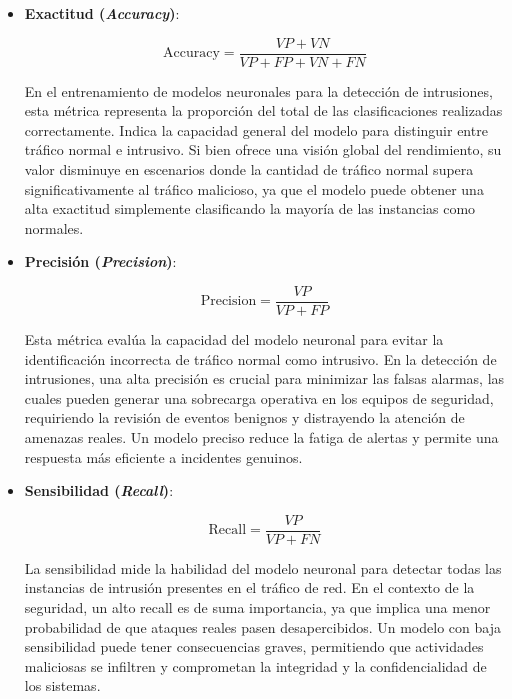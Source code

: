 \begin{itemize}
    \item \textbf{Exactitud (\textit{Accuracy})}: \label{met:Accuracy}
    
\begin{equation}
    \text{Accuracy} = \frac{VP + VN}{VP + FP + VN + FN}
\end{equation}

En el entrenamiento de modelos neuronales para la detección de intrusiones, esta métrica representa la proporción del total de las clasificaciones realizadas correctamente. Indica la capacidad general del modelo para distinguir entre tráfico normal e intrusivo. Si bien ofrece una visión global del rendimiento, su valor disminuye en escenarios donde la cantidad de tráfico normal supera significativamente al tráfico malicioso, ya que el modelo puede obtener una alta exactitud simplemente clasificando la mayoría de las instancias como normales.

\item \textbf{Precisión (\textit{Precision})}: \label{met:Precision}

\begin{equation}
    \text{Precision} = \frac{VP}{VP + FP}
\end{equation}

Esta métrica evalúa la capacidad del modelo neuronal para evitar la identificación incorrecta de tráfico normal como intrusivo. En la detección de intrusiones, una alta precisión es crucial para minimizar las falsas alarmas, las cuales pueden generar una sobrecarga operativa en los equipos de seguridad, requiriendo la revisión de eventos benignos y distrayendo la atención de amenazas reales. Un modelo preciso reduce la fatiga de alertas y permite una respuesta más eficiente a incidentes genuinos.

\item \textbf{Sensibilidad (\textit{Recall})}: \label{met:Recall}

\begin{equation}
    \text{Recall} = \frac{VP}{VP + FN}
\end{equation}

La sensibilidad mide la habilidad del modelo neuronal para detectar todas las instancias de intrusión presentes en el tráfico de red. En el contexto de la seguridad, un alto recall es de suma importancia, ya que implica una menor probabilidad de que ataques reales pasen desapercibidos. Un modelo con baja sensibilidad puede tener consecuencias graves, permitiendo que actividades maliciosas se infiltren y comprometan la integridad y la confidencialidad de los sistemas.


\end{itemize}
